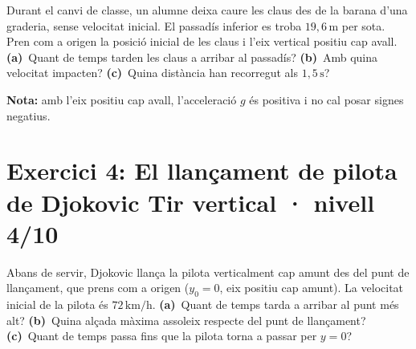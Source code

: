 \documentclass[11pt,a4paper]{article}
\begin{document}
Durant el canvi de classe, un alumne deixa caure les claus des de la barana d'una graderia, sense velocitat inicial. El passadís inferior es troba $19{,}6\,\mathrm{m}$ per sota. Pren com a origen la posició inicial de les claus i l'eix vertical positiu cap avall. \textbf{(a)}~Quant de temps tarden les claus a arribar al passadís? \textbf{(b)}~Amb quina velocitat impacten? \textbf{(c)}~Quina distància han recorregut als $1{,}5\,\mathrm{s}$?

\begin{center}
\end{center}

\textbf{Nota:} amb l'eix positiu cap avall, l'acceleració $g$ és positiva i no cal posar signes negatius.

\clearpage

\section*{Exercici 4: El llançament de pilota de Djokovic \hfill \normalfont Tir vertical · nivell 4/10}

Abans de servir, Djokovic llança la pilota verticalment cap amunt des del punt de llançament, que prens com a origen ($y_0=0$, eix positiu cap amunt). La velocitat inicial de la pilota és $72\,\mathrm{km/h}$. \textbf{(a)}~Quant de temps tarda a arribar al punt més alt? \textbf{(b)}~Quina alçada màxima assoleix respecte del punt de llançament? \textbf{(c)}~Quant de temps passa fins que la pilota torna a passar per $y=0$?
\end{document}
